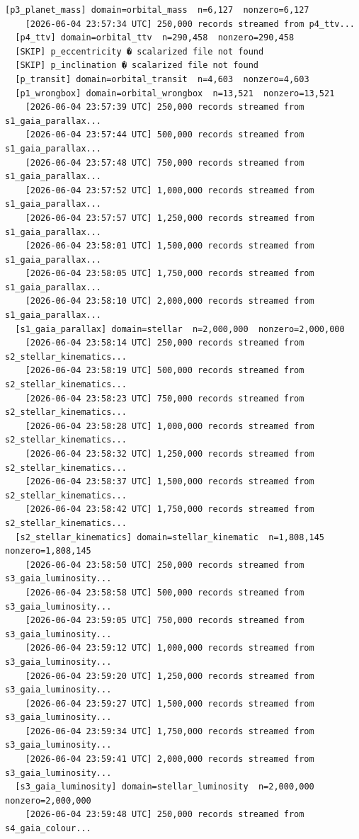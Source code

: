 \documentclass[11pt, letterpaper, openany]{book}
\begin{document}
\begin{empiricalbox}
\begin{lstlisting}[style=terminal]
  [p3_planet_mass] domain=orbital_mass  n=6,127  nonzero=6,127
    [2026-06-04 23:57:34 UTC] 250,000 records streamed from p4_ttv...
  [p4_ttv] domain=orbital_ttv  n=290,458  nonzero=290,458
  [SKIP] p_eccentricity � scalarized file not found
  [SKIP] p_inclination � scalarized file not found
  [p_transit] domain=orbital_transit  n=4,603  nonzero=4,603
  [p1_wrongbox] domain=orbital_wrongbox  n=13,521  nonzero=13,521
    [2026-06-04 23:57:39 UTC] 250,000 records streamed from s1_gaia_parallax...
    [2026-06-04 23:57:44 UTC] 500,000 records streamed from s1_gaia_parallax...
    [2026-06-04 23:57:48 UTC] 750,000 records streamed from s1_gaia_parallax...
    [2026-06-04 23:57:52 UTC] 1,000,000 records streamed from s1_gaia_parallax...
    [2026-06-04 23:57:57 UTC] 1,250,000 records streamed from s1_gaia_parallax...
    [2026-06-04 23:58:01 UTC] 1,500,000 records streamed from s1_gaia_parallax...
    [2026-06-04 23:58:05 UTC] 1,750,000 records streamed from s1_gaia_parallax...
    [2026-06-04 23:58:10 UTC] 2,000,000 records streamed from s1_gaia_parallax...
  [s1_gaia_parallax] domain=stellar  n=2,000,000  nonzero=2,000,000
    [2026-06-04 23:58:14 UTC] 250,000 records streamed from s2_stellar_kinematics...
    [2026-06-04 23:58:19 UTC] 500,000 records streamed from s2_stellar_kinematics...
    [2026-06-04 23:58:23 UTC] 750,000 records streamed from s2_stellar_kinematics...
    [2026-06-04 23:58:28 UTC] 1,000,000 records streamed from s2_stellar_kinematics...
    [2026-06-04 23:58:32 UTC] 1,250,000 records streamed from s2_stellar_kinematics...
    [2026-06-04 23:58:37 UTC] 1,500,000 records streamed from s2_stellar_kinematics...
    [2026-06-04 23:58:42 UTC] 1,750,000 records streamed from s2_stellar_kinematics...
  [s2_stellar_kinematics] domain=stellar_kinematic  n=1,808,145  nonzero=1,808,145
    [2026-06-04 23:58:50 UTC] 250,000 records streamed from s3_gaia_luminosity...
    [2026-06-04 23:58:58 UTC] 500,000 records streamed from s3_gaia_luminosity...
    [2026-06-04 23:59:05 UTC] 750,000 records streamed from s3_gaia_luminosity...
    [2026-06-04 23:59:12 UTC] 1,000,000 records streamed from s3_gaia_luminosity...
    [2026-06-04 23:59:20 UTC] 1,250,000 records streamed from s3_gaia_luminosity...
    [2026-06-04 23:59:27 UTC] 1,500,000 records streamed from s3_gaia_luminosity...
    [2026-06-04 23:59:34 UTC] 1,750,000 records streamed from s3_gaia_luminosity...
    [2026-06-04 23:59:41 UTC] 2,000,000 records streamed from s3_gaia_luminosity...
  [s3_gaia_luminosity] domain=stellar_luminosity  n=2,000,000  nonzero=2,000,000
    [2026-06-04 23:59:48 UTC] 250,000 records streamed from s4_gaia_colour...

\end{lstlisting}
\end{empiricalbox}
\end{document}
